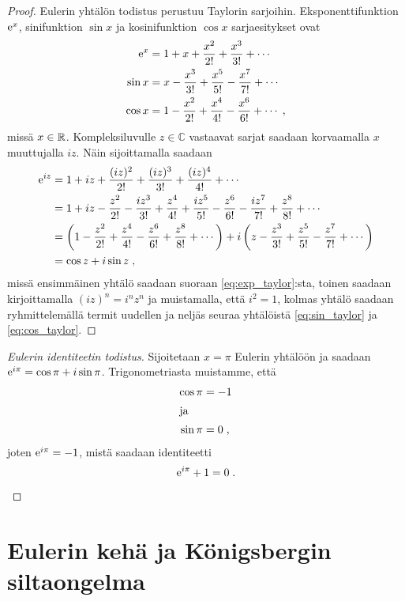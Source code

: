 \begin{proof}
  Eulerin yhtälön todistus perustuu Taylorin sarjoihin. Eksponenttifunktion $\mathrm{e}^x$, sinifunktion $\sin x$ ja kosinifunktion $\cos x$ sarjaesitykset ovat
  \begin{align}
    \mathrm{e}^x &= 1 + x + \frac{x^2}{2!} + \frac{x^3}{3!} + \cdots \label{eq:exp_taylor}  \\
    \sin x &= x - \frac{x^3}{3!} + \frac{x^5}{5!} - \frac{x^7}{7!} + \cdots \label{eq:sin_taylor} \\
    \cos x &= 1 - \frac{x^2}{2!} + \frac{x^4}{4!} - \frac{x^6}{6!} + \cdots \label{eq:cos_taylor} \; ,
  \end{align}
  missä $x\in \mathbb{R}$. Kompleksiluvulle $z\in\mathbb{C}$ vastaavat sarjat saadaan korvaamalla $x$ muuttujalla $iz$. Näin sijoittamalla saadaan
  \[
    \begin{split}
      \mathrm{e}^{iz} &= 1 + iz + \frac{(iz)^2}{2!} + \frac{(iz)^3}{3!} + \frac{(iz)^4}{4!} + \cdots \\
      & =1 + iz - \frac{z^2}{2!} - \frac{iz^3}{3!} + \frac{z^4}{4!} + \frac{iz^5}{5!} - \frac{z^6}{6!} - \frac{iz^7}{7!} + \frac{z^8}{8!} + \cdots \\
      &= \left(1 - \frac{z^2}{2!} + \frac{z^4}{4!} - \frac{z^6}{6!} + \frac{z^8}{8!} + \cdots\right)
      + i\left(z - \frac{z^3}{3!} + \frac{z^5}{5!} - \frac{z^7}{7!} + \cdots \right) \\
      &= \cos z + i\sin z\; ,
    \end{split}
  \]
  missä ensimmäinen yhtälö saadaan suoraan \eqref{eq:exp_taylor}:sta, toinen saadaan kirjoittamalla $(iz)^n = i^nz^n$ ja muistamalla, että $i^2 = 1$, kolmas yhtälö saadaan ryhmittelemällä termit uudellen ja neljäs seuraa yhtälöistä \eqref{eq:sin_taylor} ja \eqref{eq:cos_taylor}.
\end{proof}

\begin{proof}[Eulerin identiteetin todistus]
  Sijoitetaan $x=\pi$ Eulerin yhtälöön ja saadaan $\mathrm{e}^{i\pi} = \cos\pi + i\sin\pi$. Trigonometriasta muistamme, että
  \begin{align}
    \cos\pi &= -1 \\
    \intertext{ja}
    \sin\pi &= 0\; ,
  \end{align}
  joten $\mathrm{e}^{i\pi} = -1$, mistä saadaan identiteetti
  \[
    \mathrm{e}^{i\pi}+1 = 0\; .
  \]
\end{proof}


\chapter{Eulerin kehä ja Königsbergin siltaongelma}
\label{cha:eulerin_keha}

